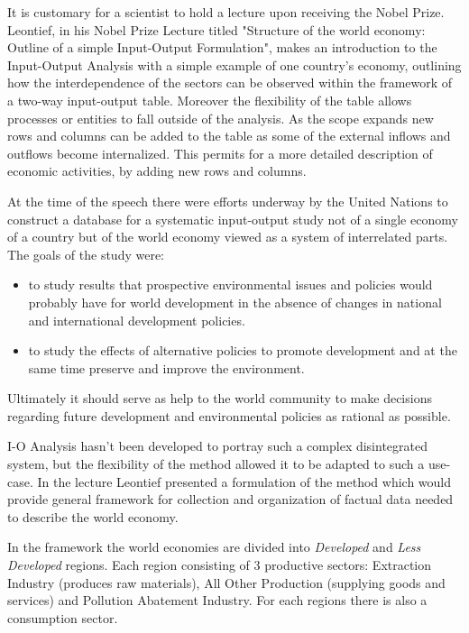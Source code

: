 \documentclass[12pt,a4paper]{scrartcl}
\begin{document}
	It is customary for a scientist to hold a lecture upon receiving the Nobel Prize. Leontief, in his Nobel Prize Lecture titled "Structure of the world economy: Outline of a simple Input-Output Formulation", makes an introduction to the Input-Output Analysis with a simple example of one country's economy, outlining how the interdependence of the sectors can be observed within the framework of a two-way input-output table. Moreover the flexibility of the table allows processes or entities to fall outside of the analysis. As the scope expands new rows and columns can be added to the table as some of the external inflows and outflows become internalized. This permits for a more detailed description of economic activities, by adding new rows and columns.
	
	At the time of the speech there were efforts underway by the United Nations to construct a database for a systematic input-output study not of a single economy of a country but of the world economy viewed as a system of interrelated parts. The goals of the study were:
	
	\begin{itemize}
		\item  to study results that prospective environmental issues and policies would probably have for world development in the absence of changes in national and international development policies.
		\item to study the effects of alternative policies to promote development and at the same time preserve and improve the environment.
	\end{itemize}

	Ultimately it should serve as help to the world community to make decisions regarding future development and environmental policies as rational as possible.
	
	I-O Analysis hasn't been developed to portray such a complex disintegrated system, but the flexibility of the method allowed it to be adapted to such a use-case. In the lecture Leontief presented a formulation of the method which would provide general framework for collection and organization of factual data needed to describe the world economy.
	
	In the framework the world economies are divided into \textit{Developed} and \textit{Less Developed} regions. Each region consisting of 3 productive sectors: Extraction Industry (produces raw materials), All Other Production (supplying goods and services) and Pollution Abatement Industry. For each regions there is also a consumption sector.
	
\end{document}
